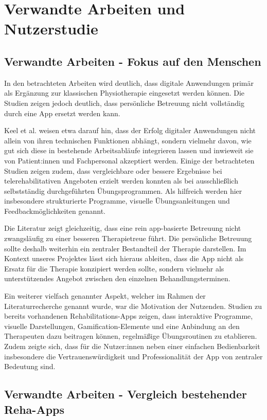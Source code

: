 \section{Verwandte Arbeiten und Nutzerstudie}
\subsection{Verwandte Arbeiten - Fokus auf den Menschen}

In den betrachteten Arbeiten wird deutlich, dass digitale Anwendungen primär als Ergänzung zur klassischen Physiotherapie eingesetzt werden können. Die Studien zeigen jedoch deutlich, dass persönliche Betreuung nicht vollständig durch eine App ersetzt werden kann.

Keel et al. weisen etwa darauf hin, dass der Erfolg digitaler Anwendungen nicht allein von ihren technischen Funktionen abhängt, sondern vielmehr davon, wie gut sich diese in bestehende Arbeitsabläufe integrieren lassen und inwieweit sie von Patient:innen und Fachpersonal akzeptiert werden. Einige der betrachteten Studien zeigen zudem, dass vergleichbare oder bessere Ergebnisse bei telerehabilitativen Angeboten erzielt werden konnten als bei ausschließlich selbstständig durchgeführten Übungsprogrammen. Als hilfreich werden hier insbesondere strukturierte Programme, visuelle Übungsanleitungen und Feedbackmöglichkeiten genannt.

Die Literatur zeigt gleichzeitig, dass eine rein app-basierte Betreuung nicht zwangsläufig zu einer besseren Therapietreue führt. Die persönliche Betreuung sollte deshalb weiterhin ein zentraler Bestandteil der Therapie darstellen. Im Kontext unseres Projektes lässt sich hieraus ableiten, dass die App nicht als Ersatz für die Therapie konzipiert werden sollte, sondern vielmehr als unterstützendes Angebot zwischen den einzelnen Behandlungsterminen.

Ein weiterer vielfach genannter Aspekt, welcher im Rahmen der Literaturrecherche genannt wurde, war die Motivation der Nutzenden. Studien zu bereits vorhandenen Rehabilitations-Apps zeigen, dass interaktive Programme, visuelle Darstellungen, Gamification-Elemente und eine Anbindung an den Therapeuten dazu beitragen können, regelmäßige Übungsroutinen zu etablieren. Zudem zeigte sich, dass für die Nutzer:innen neben einer einfachen Bedienbarkeit insbesondere die Vertrauenswürdigkeit und Professionalität der App von zentraler Bedeutung sind.

\subsection{Verwandte Arbeiten - Vergleich bestehender Reha-Apps}

